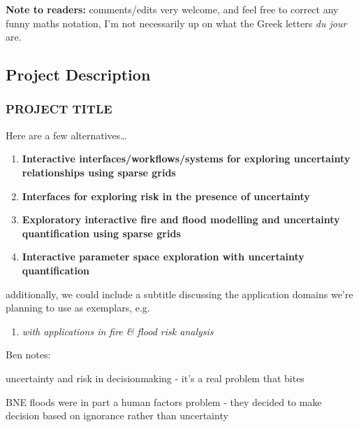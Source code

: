 \documentclass[a4paper,fontsize=12pt]{scrartcl}
\author{}
\date{\today}
\begin{document}
\noindent
\textbf{Note to readers:} comments/edits very welcome, and feel free to correct any funny maths notation, I'm not
  necessarily up on what the Greek letters \emph{du jour} are.

\renewcommand{\thesection}{\Alph{section}}

\setcounter{section}{3} %
\subsection{Project Description}
\label{sec:project-description}

\subsubsection*{PROJECT TITLE}

\noindent Here are a few alternatives\ldots

\begin{enumerate}
  \item \textbf{Interactive interfaces/workflows/systems for exploring uncertainty relationships using sparse grids}
\item \textbf{Interfaces for exploring risk in the presence of uncertainty}
\item \textbf{Exploratory interactive fire and flood modelling and
  uncertainty quantification using sparse grids}
\item \textbf{Interactive parameter space exploration with uncertainty
  quantification}
\end{enumerate}

\noindent additionally, we could include a subtitle discussing the
application domains we're planning to use as exemplars, e.g.

\begin{enumerate}
\item \emph{with applications in fire \& flood risk analysis}
\end{enumerate}

Ben notes:

uncertainty and risk in decisionmaking - it's a real problem that bites

BNE floods were in part a human factors problem - they decided to make
decision based on ignorance rather than uncertainty
\end{document}

